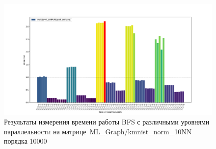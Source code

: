 \begin{landscape}
\begin{figure}
    \thispagestyle{empty} 
    \centering
    \includegraphics[height=0.8\textwidth]{figures/barPlot10000.pdf}
    \caption{Результаты измерения времени работы BFS с различными уровнями параллельности на мат\-ри\-це~ML\_Graph/kmnist\_norm\_10NN порядка 10000\\}
    \label{fig:barPlot10000}
\end{figure}
\end{landscape}


